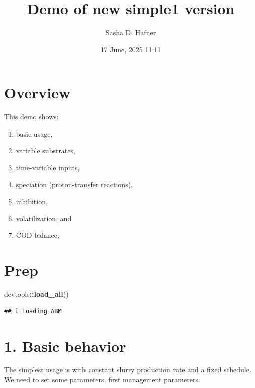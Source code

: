 \documentclass[
]{article}
\title{Demo of new simple1 version}
\author{Sasha D. Hafner}
\date{17 June, 2025 11:11}
\newenvironment{Shaded}{\begin{snugshade}}{\end{snugshade}}
\newcommand{\FunctionTok}[1]{\textcolor[rgb]{0.13,0.29,0.53}{\textbf{#1}}}
\newcommand{\NormalTok}[1]{#1}
\newcommand{\SpecialCharTok}[1]{\textcolor[rgb]{0.81,0.36,0.00}{\textbf{#1}}}
\providecommand{\tightlist}{%
  \setlength{\itemsep}{0pt}\setlength{\parskip}{0pt}}
\begin{document}
\maketitle

\hypertarget{overview}{%
\section{Overview}\label{overview}}

This demo shows:

\begin{enumerate}
\def\labelenumi{\arabic{enumi}.}
\tightlist
\item
  basic usage,
\item
  variable substrates,
\item
  time-variable inputs,
\item
  speciation (proton-transfer reactions),
\item
  inhibition,
\item
  volatilization, and
\item
  COD balance,
\end{enumerate}

\hypertarget{prep}{%
\section{Prep}\label{prep}}

\begin{Shaded}
\begin{Highlighting}[]
\NormalTok{devtools}\SpecialCharTok{::}\FunctionTok{load\_all}\NormalTok{()}
\end{Highlighting}
\end{Shaded}

\begin{verbatim}
## i Loading ABM
\end{verbatim}

\hypertarget{basic-behavior}{%
\section{1. Basic behavior}\label{basic-behavior}}

The simplest usage is with constant slurry production rate and a fixed
schedule. We need to set some parameters, first management parameters.
\end{document}

